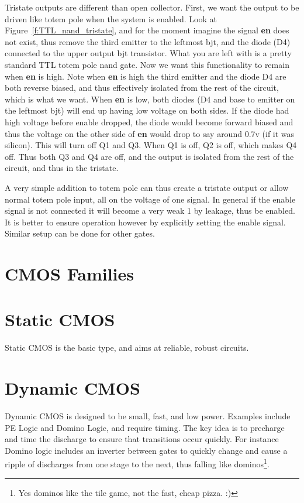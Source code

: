 Tristate outputs are different than open collector.  First, we want the output to be driven like totem pole when the system is enabled.  Look at Figure~\ref{f:TTL_nand_tristate}, and for the moment imagine the signal \textbf{en} does not exist, thus remove the third emitter to the leftmost bjt, and the diode (D4) connected to the upper output bjt transistor.  What you are left with is a pretty standard TTL totem pole nand gate.  Now we want this functionality to remain when \textbf{en} is high.  Note when \textbf{en} is high the third emitter and the diode D4 are both reverse biased, and thus effectively isolated from the rest of the circuit, which is what we want.  When \textbf{en} is low, both diodes (D4 and base to emitter on the leftmost bjt) will end up having low voltage on both sides.  If the diode had high voltage before enable dropped, the diode would become forward biased and thus the voltage on the other side of \textbf{en} would drop to say around 0.7v (if it was silicon).  This will turn off Q1 and Q3.  When Q1 is off, Q2 is off, which makes Q4 off.  Thus both Q3 and Q4 are off, and the output is isolated from the rest of the circuit, and thus in the tristate.

A very simple addition to totem pole can thus create a tristate output or allow normal totem pole input, all on the voltage of one signal.  In general if the enable signal is not connected it will become a very weak 1 by leakage, thus be enabled.  It is better to ensure operation however by explicitly setting the enable signal.  Similar setup can be done for other gates.


\section{CMOS Families}

\section{Static CMOS}

Static CMOS is the basic type, and aims at reliable, robust circuits.

\section{Dynamic CMOS}

Dynamic CMOS is designed to be small, fast, and low power.  Examples include PE Logic and Domino Logic, and require timing.  The key idea is to precharge and time the discharge to ensure that transitions occur quickly.  For instance Domino logic includes an inverter between gates to quickly change and cause a ripple of discharges from one stage to the next, thus falling like dominos\footnote{Yes dominos like the tile game, not the fast, cheap pizza. :)}.

